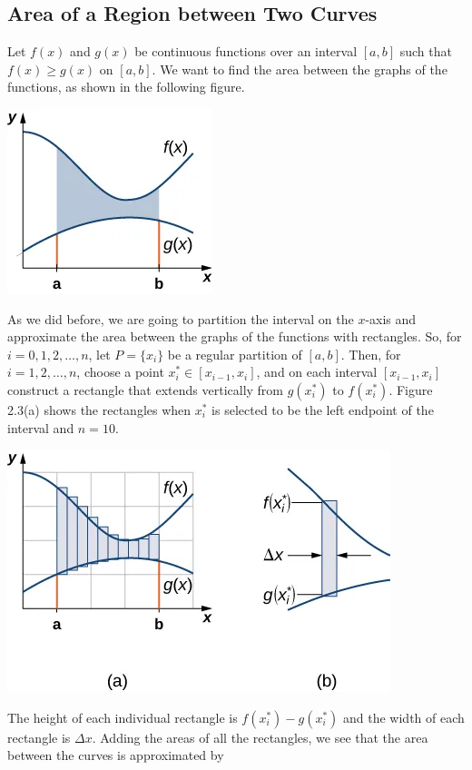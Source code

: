 \documentclass{report}
\begin{document}
    \subsection*{Area of a Region between Two Curves}
    Let \( f(x) \) and \( g(x) \) be continuous functions over an interval \([a,b]\) such that \( f(x) \geq g(x) \) on \([a,b]\). We want to find the area between the graphs of the functions, as shown in the following figure.
    \bigbreak \noindent 
    \begin{center}
        \includegraphics[scale=.5]{./figures/graph1.png  }
    \end{center}
    \bigbreak \noindent 
    As we did before, we are going to partition the interval on the \( x \)-axis
    and approximate the area between the graphs of the functions with rectangles. So, for \( i=0,1,2,\ldots,n \),
    let \( P = \{ x_i \} \)
    be a regular partition of \( [a,b] \).
    Then, for \( i=1,2,\ldots,n \),
    choose a point \( x^*_i \in [x_{i-1}, x_i] \),
    and on each interval \( [x_{i-1}, x_i] \)
    construct a rectangle that extends vertically from \( g(x^*_i) \)
    to \( f(x^*_i) \).
    Figure 2.3(a) shows the rectangles when \( x^*_i \)
    is selected to be the left endpoint of the interval and \( n=10 \).
    \begin{center}
        \includegraphics[scale=0.5]{ ./figures/2aaddefc-a60a-41ed-8312-ef6960ad3b6c.png }
    \end{center}
    \pagebreak \bigbreak \noindent 
    The height of each individual rectangle is \( f(x^*_i) - g(x^*_i) \) and the width of each rectangle is \( \Delta x \).
    Adding the areas of all the rectangles, we see that the area between the curves is approximated by
\end{document}
